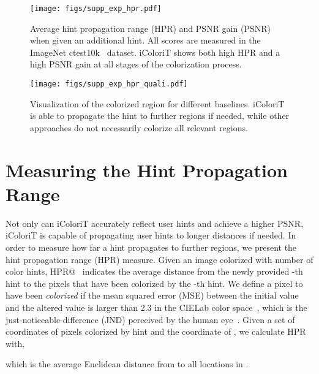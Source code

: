 \documentclass[10pt,twocolumn,letterpaper]{article}
\begin{document}
\begin{figure*}[t]
    \centering
    \texttt{[image: figs/supp\_exp\_hpr.pdf]}
    \vspace{-0.45cm}
    \caption{Average hint propagation range (HPR) and PSNR gain (PSNR) when given an additional hint. All scores are measured in the ImageNet ctest10k~\cite{ctest} dataset. iColoriT shows both high HPR and a high PSNR gain at all stages of the colorization process. }
    \label{fig:exp_quanti_hpr}
    \vspace{-0.2cm}
\end{figure*}


\begin{figure}[t]
    \centering
    \texttt{[image: figs/supp\_exp\_hpr\_quali.pdf]}
    \vspace{-0.5cm}
    \caption{Visualization of the colorized region  for different baselines. iColoriT is able to propagate the hint to further regions if needed, while other approaches do not necessarily colorize all relevant regions. }
    \label{fig:exp_hpr_quali}
    \vspace{-0.5cm}
\end{figure}

\vspace{+0.1cm}
\section{Measuring the Hint Propagation Range}
\label{sec:hpr} 
Not only can iColoriT accurately reflect user hints and achieve a higher PSNR, iColoriT is capable of propagating user hints to longer distances if needed. 
In order to measure how far a hint propagates to further regions, we present the hint propagation range (HPR) measure. 
Given an image  colorized with  number of color hints, HPR@~ indicates the average distance from the newly provided -th hint to the pixels that have been colorized by the -th hint. 
We define a pixel to have been \textit{colorized} if the mean squared error (MSE) between the initial value and the altered value is larger than 2.3 in the CIELab color space~\cite{cie}, which is the just-noticeable-difference (JND) perceived by the human eye~\cite{jnd}. 
Given a set of coordinates  of pixels colorized by hint  and the coordinate of  , we calculate HPR with, 


which is the average Euclidean distance from  to all locations in .
\end{document}
